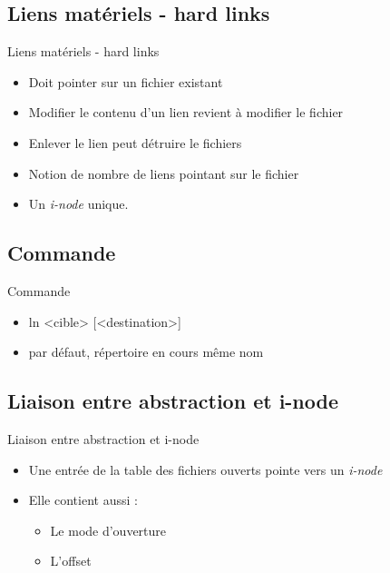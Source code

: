 \begin{frame}{\sectitle}
\def\subsectitle{Liens matériels - hard links}
\subsection{\subsectitle}
\begin{block}{\subsectitle}
    \begin{itemize}
        \item Doit pointer sur un fichier existant
        \item Modifier le contenu d'un lien revient à modifier le fichier
        \item Enlever le lien peut détruire le fichiers
        \item Notion de nombre de liens pointant sur le fichier
        \item Un \textit{i-node} unique.
    \end{itemize}
\end{block}


\def\subsectitle{Commande}
\subsection{\subsectitle}
\begin{exampleblock}{\subsectitle}
    \begin{itemize}
        \item ln <cible> [<destination>]
        \item par défaut, répertoire en cours même nom
    \end{itemize}
\end{exampleblock}
\end{frame}


\begin{frame}{\sectitle}
\def\subsectitle{Liaison entre abstraction et i-node}
\subsection{\subsectitle}
\begin{block}{\subsectitle}
\begin{itemize}
    \item Une entrée de la table des fichiers ouverts pointe vers un
        \textit{i-node}
    \item Elle contient aussi :
        \begin{itemize}
            \item Le mode d'ouverture
            \item L'offset
        \end{itemize}
\end{itemize}
\end{block}
\end{frame}


